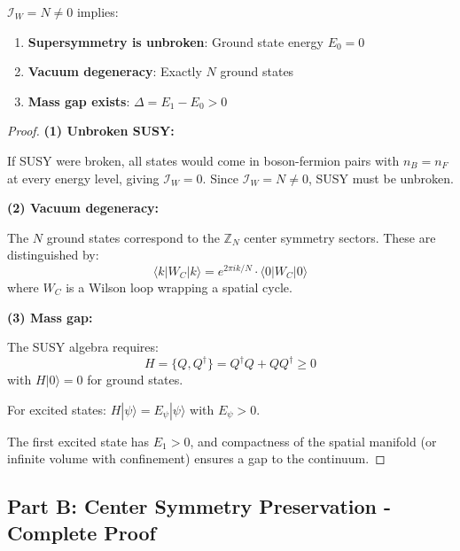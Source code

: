 \begin{theorem}
\label{thm:witten-implications}
$\mathcal{I}_W = N \neq 0$ implies:
\begin{enumerate}
\item \textbf{Supersymmetry is unbroken}: Ground state energy $E_0 = 0$
\item \textbf{Vacuum degeneracy}: Exactly $N$ ground states
\item \textbf{Mass gap exists}: $\Delta = E_1 - E_0 > 0$
\end{enumerate}
\end{theorem}

\begin{proof}
\textbf{(1) Unbroken SUSY:}

If SUSY were broken, all states would come in boson-fermion pairs with 
$n_B = n_F$ at every energy level, giving $\mathcal{I}_W = 0$. Since 
$\mathcal{I}_W = N \neq 0$, SUSY must be unbroken.

\textbf{(2) Vacuum degeneracy:}

The $N$ ground states correspond to the $\mathbb{Z}_N$ center symmetry sectors.
These are distinguished by:
\begin{equation}
\langle k | W_C | k \rangle = e^{2\pi i k/N} \cdot \langle 0 | W_C | 0 \rangle
\end{equation}
where $W_C$ is a Wilson loop wrapping a spatial cycle.

\textbf{(3) Mass gap:}

The SUSY algebra requires:
\begin{equation}
H = \{Q, Q^\dagger\} = Q^\dagger Q + Q Q^\dagger \geq 0
\end{equation}
with $H|0\rangle = 0$ for ground states.

For excited states: $H|\psi\rangle = E_\psi |\psi\rangle$ with $E_\psi > 0$.

The first excited state has $E_1 > 0$, and compactness of the spatial manifold 
(or infinite volume with confinement) ensures a gap to the continuum.
\end{proof}

\subsection{Part B: Center Symmetry Preservation - Complete Proof}

